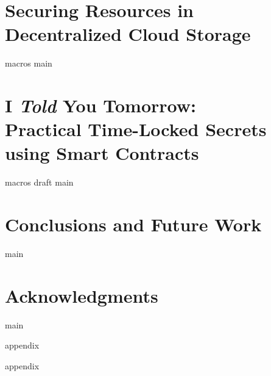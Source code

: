 \documentclass[12pt,a4paper,oldfontcommands,openright]{memoir}
\begin{document}
\chapter[Decentralized Cloud Storage]{Securing Resources in Decentralized Cloud Storage}
\label{chap:dcs}
{macros}
{main}

\chapter[I Told You Tomorrow]{I {\em Told} You Tomorrow:\\Practical Time-Locked Secrets using Smart Contracts}
\label{chap:ityt}
{macros}
{draft}
{main}

\chapter[Conclusions]{Conclusions and Future Work}
\label{chap:conclusions}
{main}



\chapter*{Acknowledgments}
\label{chap:acknowledgments}
{main}










\appendix

{appendix}

{appendix}

\end{document}
